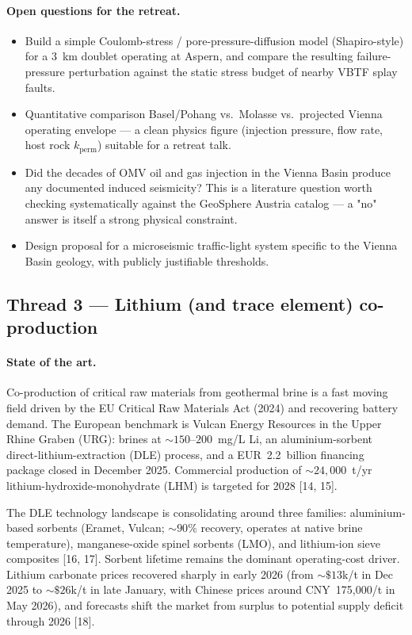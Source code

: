\documentclass{article}
\begin{document}
\paragraph{Open questions for the retreat.}
\begin{itemize}
\item Build a simple Coulomb-stress / pore-pressure-diffusion model
(Shapiro-style) for a 3~km doublet operating at Aspern, and compare
the resulting failure-pressure perturbation against the static stress
budget of nearby VBTF splay faults.
\item Quantitative comparison Basel/Pohang vs.\ Molasse vs.\ projected Vienna
operating envelope --- a clean physics figure (injection pressure,
flow rate, host rock $k_{\mathrm{perm}}$) suitable for a retreat talk.
\item Did the decades of OMV oil and gas injection in the Vienna Basin
produce any documented induced seismicity? This is a literature
question worth checking systematically against the GeoSphere Austria
catalog --- a "no" answer is itself a strong physical constraint.
\item Design proposal for a microseismic traffic-light system specific
to the Vienna Basin geology, with publicly justifiable thresholds.
\end{itemize}

\subsection*{Thread 3 --- Lithium (and trace element) co-production}

\paragraph{State of the art.}
Co-production of critical raw materials from geothermal brine is a fast
moving field driven by the EU Critical Raw Materials Act (2024) and
recovering battery demand. The European benchmark is Vulcan Energy
Resources in the Upper Rhine Graben (URG): brines at $\sim 150$--$200$~mg/L
Li, an aluminium-sorbent direct-lithium-extraction (DLE) process, and
a EUR~2.2~billion financing package closed in December 2025.
Commercial production of $\sim 24{,}000$~t/yr lithium-hydroxide-monohydrate
(LHM) is targeted for 2028 [14, 15].

The DLE technology landscape is consolidating around three families:
aluminium-based sorbents (Eramet, Vulcan; $\sim 90\%$ recovery, operates
at native brine temperature), manganese-oxide spinel sorbents (LMO),
and lithium-ion sieve composites [16, 17]. Sorbent
lifetime remains the dominant operating-cost driver. Lithium carbonate
prices recovered sharply in early 2026 (from $\sim\$13$k/t in Dec 2025
to $\sim\$26$k/t in late January, with Chinese prices around
CNY~175{,}000/t in May 2026), and forecasts shift the market from
surplus to potential supply deficit through 2026
[18].
\end{document}
